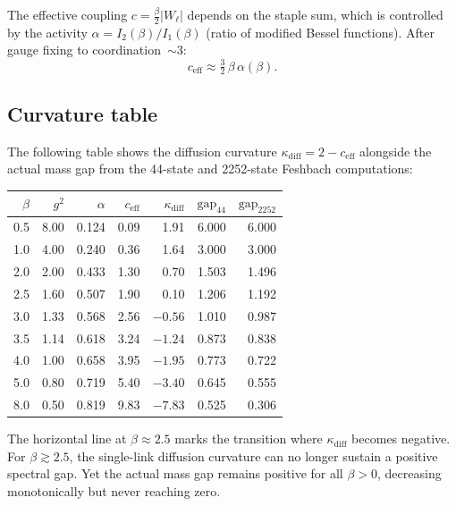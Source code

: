 \documentclass[11pt,a4paper]{article}
\theoremstyle{plain}
\theoremstyle{definition}
\theoremstyle{remark}
\begin{document}
The effective coupling $c = \tfrac{\beta}{2}|W_\ell|$ depends on the
staple sum, which is controlled by the activity
$\alpha = I_2(\beta)/I_1(\beta)$ (ratio of modified Bessel functions).
After gauge fixing to coordination~$\sim 3$:
\begin{equation}
  c_{\mathrm{eff}} \approx \tfrac{3}{2}\,\beta\,\alpha(\beta).
\end{equation}

\subsection{Curvature table}

The following table shows the diffusion curvature $\kappa_{\mathrm{diff}}
= 2 - c_{\mathrm{eff}}$ alongside the actual mass gap from the
44-state and 2252-state Feshbach computations:

\begin{center}
\renewcommand{\arraystretch}{1.2}
\begin{tabular}{r r r r r r r}
\toprule
$\beta$ & $g^2$ & $\alpha$ & $c_{\mathrm{eff}}$ &
$\kappa_{\mathrm{diff}}$ & $\mathrm{gap}_{44}$ & $\mathrm{gap}_{2252}$ \\
\midrule
0.5 & 8.00 & 0.124 & 0.09 & 1.91 & 6.000 & 6.000 \\
1.0 & 4.00 & 0.240 & 0.36 & 1.64 & 3.000 & 3.000 \\
2.0 & 2.00 & 0.433 & 1.30 & 0.70 & 1.503 & 1.496 \\
2.5 & 1.60 & 0.507 & 1.90 & 0.10 & 1.206 & 1.192 \\
\midrule
3.0 & 1.33 & 0.568 & 2.56 & $-0.56$ & 1.010 & 0.987 \\
3.5 & 1.14 & 0.618 & 3.24 & $-1.24$ & 0.873 & 0.838 \\
4.0 & 1.00 & 0.658 & 3.95 & $-1.95$ & 0.773 & 0.722 \\
5.0 & 0.80 & 0.719 & 5.40 & $-3.40$ & 0.645 & 0.555 \\
8.0 & 0.50 & 0.819 & 9.83 & $-7.83$ & 0.525 & 0.306 \\
\bottomrule
\end{tabular}
\end{center}

The horizontal line at $\beta \approx 2.5$ marks the transition where
$\kappa_{\mathrm{diff}}$ becomes negative.  For $\beta \gtrsim 2.5$,
the single-link diffusion curvature can no longer sustain a positive
spectral gap.  Yet the actual mass gap remains positive for all
$\beta > 0$, decreasing monotonically but never reaching zero.
\end{document}
